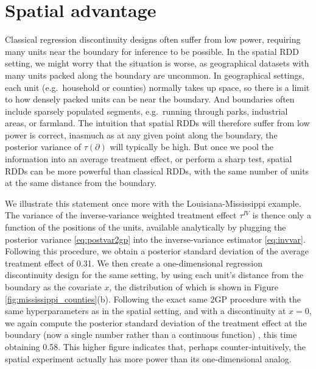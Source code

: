 \documentclass[letter]{article}
\newcommand{\boundary}{\partial}
\newcommand{\invvar}{\tau^{IV}}
\begin{document}
    	\section{Spatial advantage}\label{spatial-advantage}

Classical regression discontinuity designs often suffer from low power, requiring many units near the boundary for inference to be possible.
In the spatial RDD setting, we might worry that the situation is worse, as geographical datasets with many units packed along the boundary are uncommon.
In geographical settings, each unit (e.g.~household or counties) normally takes up space, so there is a limit to how densely packed units can be near the boundary.
And boundaries often include sparsely populated segments, e.g.~running through parks, industrial areas, or farmland.
The intuition that spatial RDDs will therefore suffer from low power is correct, inasmuch as at any given point along the boundary, the posterior variance of \(\tau(\boundary)\) will typically be high.
But once we pool the information into an average treatment effect, or perform a sharp test, spatial RDDs can be more powerful than classical RDDs, with the same number of units at the same distance from the boundary.

We illustrate this statement once more with the Louisiana-Mississippi example.
The variance of the inverse-variance weighted treatment effect \(\invvar\) is thence only a function of the positions of the units, available analytically by plugging the posterior variance \eqref{eq:postvar2gp} into the inverse-variance estimator \eqref{eq:invvar}.
Following this procedure, we obtain a posterior standard deviation of the average treatment effect of 0.31.
We then create a one-dimensional regression discontinuity design for the same setting, by using each unit's distance from the boundary as the covariate \(x\), the distribution of which is shown in Figure \ref{fig:mississippi_counties}(b).
Following the exact same 2GP procedure with the same hyperparameters as in the spatial setting, and with a discontinuity at \(x=0\), we again compute the posterior standard deviation of the treatment effect at the boundary (now a single number rather than a continuous function) , this time obtaining 0.58.
This higher figure indicates that, perhaps counter-intuitively, the spatial experiment actually has more power than its one-dimensional analog.
\end{document}
